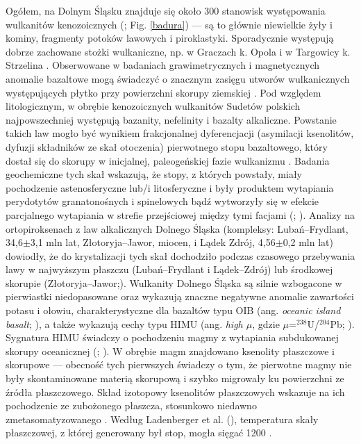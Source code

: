 \documentclass[11.5pt,twoside]{report}
\begin{document}
 Ogółem, na Dolnym Śląsku znajduje się około 300 stanowisk występowania wulkanitów kenozoicznych (\cite{Badura.2005}; Fig. \ref{badura}) --- są to głównie niewielkie żyły i kominy, fragmenty potoków lawowych i piroklastyki. Sporadycznie występują dobrze zachowane stożki wulkaniczne, np. w Graczach k. Opola i w Targowicy k. Strzelina \parencite{Krzeminska.2011}. Obserwowane w badaniach grawimetrycznych i magnetycznych anomalie bazaltowe mogą świadczyć o znacznym zasięgu utworów wulkanicznych występujących płytko przy powierzchni skorupy ziemskiej \parencite{Badura.2004}. Pod względem litologicznym, w obrębie kenozoicznych wulkanitów Sudetów polskich najpowszechniej występują bazanity, nefelinity i bazalty alkaliczne. Powstanie takich law mogło być wynikiem frakcjonalnej dyferencjacji (asymilacji ksenolitów, dyfuzji składników ze skał otoczenia) pierwotnego stopu bazaltowego, który dostał się do skorupy w inicjalnej, paleogeńskiej fazie wulkanizmu \parencite{Szymkowiak.1985}. Badania geochemiczne tych skał wskazują, że stopy, z których powstały, miały pochodzenie astenosferyczne lub/i litosferyczne i były produktem wytapiania perydotytów granatonośnych i spinelowych bąd\'{z} wytworzyły się w efekcie parcjalnego wytapiania w strefie przejściowej między tymi facjami (\cite{Puziewicz.2011}; \cite{Wilson.2006}). Analizy na ortopiroksenach z law alkalicznych Dolnego Śląska (kompleksy: Lubań--Frydlant, 34,6$\pm$3,1 mln lat, Złotoryja--Jawor, miocen, i Lądek Zdrój, 4,56$\pm$0,2 mln lat) dowiodły, że do krystalizacji tych skał dochodziło podczas czasowego przebywania lawy w najwyższym płaszczu (Lubań--Frydlant i Lądek--Zdrój) lub środkowej skorupie (Złotoryja--Jawor;\cite{Lipa.2016}). Wulkanity Dolnego Śląska są silnie wzbogacone w pierwiastki niedopasowane oraz wykazują znaczne negatywne anomalie zawartości potasu i ołowiu, charakterystyczne dla bazaltów typu OIB (ang. \textit{oceanic island basalt}; \cite{Ladenberger.2009}), a także wykazują cechy typu HIMU (ang. \textit{high $\mu$}, gdzie $\mu$=$^{238}$U/$^{204}$Pb; \cite{Wilson.1991}). Sygnatura HIMU świadczy o pochodzeniu magmy z wytapiania subdukowanej skorupy oceanicznej (\cite{Wilson.2001}; \cite{Helffrich.2001}). W obrębie magm znajdowano ksenolity płaszczowe i skorupowe --- obecność tych pierwszych świadczy o tym, że pierwotne magmy nie były skontaminowane materią skorupową i szybko migrowały ku powierzchni ze \'{z}ródła płaszczowego. Skład izotopowy ksenolitów płaszczowych wskazuje na ich pochodzenie ze zubożonego płaszcza, stosunkowo niedawno zmetasomatyzowanego \parencite{Ladenberger.2009}. Według Ladenberger et al. (\citeyear{Ladenberger.2009}), temperatura skały płaszczowej, z której generowany był stop, mogła sięgać 1200 \textcelsius.
 
\end{document}
